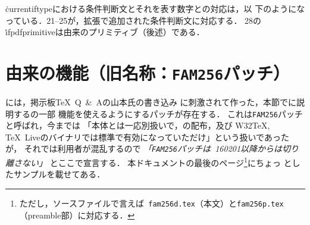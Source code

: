 \documentclass[a4paper,11pt]{jsarticle}
\begin{document}
\.{currentiftype}における条件判断文とそれを表す数字との対応は，以
下のようになっている．21--25が，\pTeX 拡張で追加された条件判断文に対応する．
28の\.{ifpdfprimitive}は\pdfTeX 由来のプリミティブ（後述）である．


\section{\OMEGA 由来の機能（旧名称：\texttt{FAM256}パッチ）}
\epTeX には，掲示板\TeX\ Q\ \&\ Aの山本氏の書き込み
\cite{yamamoto}に刺激されて作った，本節でに説明する\OMEGA の一部
機能を使えるようにするパッチが存在する．
これは\texttt{FAM256}パッチと呼ばれ，今までは
「\epTeX 本体とは一応別扱いで，\epTeX の配布，及び
W32\TeX, \TeX~Liveのバイナリでは標準で有効になっていただけ」という扱いであったが，
それでは利用者が混乱するので
\emph{「\texttt{FAM256}パッチは\epTeX~160201以降からは切り離さない」}
とここで宣言する．
本ドキュメントの最後のページ\footnote{ただし，ソースファイルで言えば{\tt
fam256d.tex}（本文）と\texttt{fam256p.tex}（preamble部）に対応する．}にちょっ
としたサンプルを載せてある．
\end{document}
